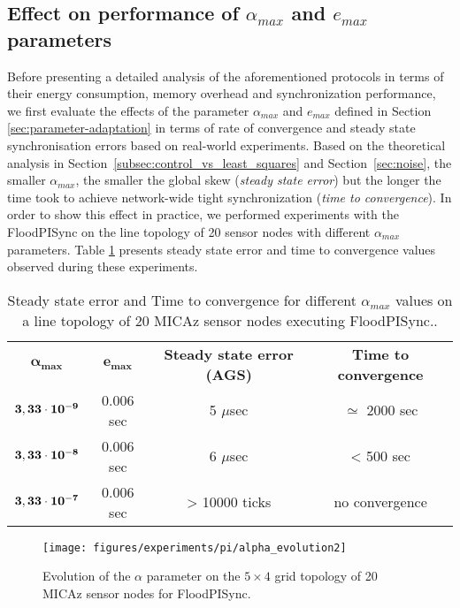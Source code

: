 \documentclass[english,a4paper,10pt,final]{article}
\numberwithin{equation}{section}
\numberwithin{figure}{section}
\begin{document}
\subsection{ Effect on performance of  $\alpha_{max}$ and $e_{max}$ parameters}
\label{sec:eval-alpha}
Before presenting a detailed analysis of the aforementioned protocols in terms of their energy consumption, memory overhead and synchronization performance, we first evaluate the effects of the parameter $\alpha_{max}$  and $e_{max}$ defined in Section \ref{sec:parameter-adaptation} in terms of rate of convergence and steady state synchronisation errors based on real-world experiments. Based on the theoretical analysis in Section~\ref{subsec:control_vs_least_squares} and Section~\ref{sec:noise}, the smaller  $\alpha_{max}$, the smaller the global skew (\textit{steady state error}) but the longer the time took to achieve network-wide tight synchronization (\textit{time to convergence}). In order to show this effect in practice, we performed experiments with the FloodPISync on the line topology of 20 sensor nodes with different  $\alpha_{max}$ parameters. Table \ref{tab:alpha} presents steady state error and time to convergence values observed during these experiments. 

\begin{table}
\center
\caption{Steady state error and Time to convergence for different $\alpha_{max}$ values on a line topology of 20 MICAz sensor nodes executing FloodPISync.\label{tab:alpha}.}

\begin{tabular}{cccc}
$\bm{\alpha_{max}}$ & $\bm{e_{max}}$ & \textbf{Steady state error (AGS)} & \textbf{Time to convergence} \\
  $\bf{3,33 \cdot 10^{-9}}$ & 0.006 sec &  5 $\mu$sec & $\simeq$ 2000 sec\\ 
  $\bf{3,33 \cdot 10^{-8}}$ & 0.006 sec &  6 $\mu$sec & < 500 sec \\ 
  $\bf{3,33 \cdot 10^{-7}}$ & 0.006 sec &  > 10000 ticks & no convergence \\ 
\end{tabular}

\end{table}

\begin{figure}
\center

\texttt{[image: figures/experiments/pi/alpha\_evolution2]}

\caption{\label{fig:alpha-evolution} Evolution of the $\alpha$ parameter on the $5\times 4$ grid topology of 20 MICAz sensor nodes for FloodPISync.}
\end{figure}
\end{document}
